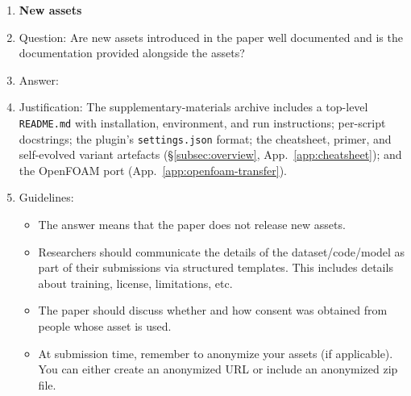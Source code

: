 \begin{enumerate}
\item {\bf New assets}
    \item[] Question: Are new assets introduced in the paper well documented and is the documentation provided alongside the assets?
    \item[] Answer: \answerYes{}
    \item[] Justification: The supplementary-materials archive includes a top-level \texttt{README.md} with installation, environment, and run instructions; per-script docstrings; the plugin's \texttt{settings.json} format; the cheatsheet, primer, and self-evolved variant artefacts (\S\ref{subsec:overview}, App.~\ref{app:cheatsheet}); and the OpenFOAM port (App.~\ref{app:openfoam-transfer}).
    \item[] Guidelines:
    \begin{itemize}
        \item The answer \answerNA{} means that the paper does not release new assets.
        \item Researchers should communicate the details of the dataset\slash code\slash model as part of their submissions via structured templates. This includes details about training, license, limitations, etc.
        \item The paper should discuss whether and how consent was obtained from people whose asset is used.
        \item At submission time, remember to anonymize your assets (if applicable). You can either create an anonymized URL or include an anonymized zip file.
    \end{itemize}


\end{enumerate}
